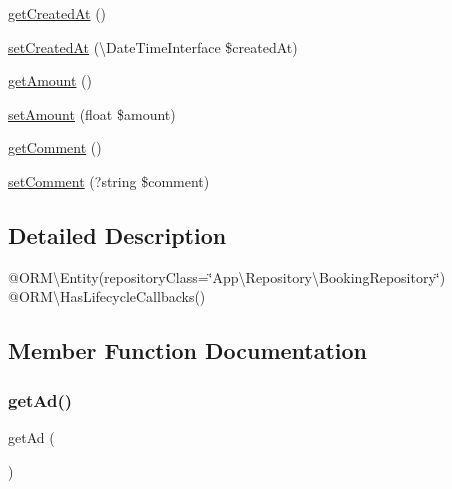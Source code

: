 \begin{DoxyCompactItemize}
\item 
\mbox{\hyperlink{class_app_1_1_entity_1_1_booking_a0f0455d4aafe27d1b0720c3bcfff2847}{get\+Created\+At}} ()
\item 
\mbox{\hyperlink{class_app_1_1_entity_1_1_booking_a2308609ef549a753223bbee71e36291e}{set\+Created\+At}} (\textbackslash{}Date\+Time\+Interface \$created\+At)
\item 
\mbox{\hyperlink{class_app_1_1_entity_1_1_booking_a4097b54f79b8353b00e8b6712f845562}{get\+Amount}} ()
\item 
\mbox{\hyperlink{class_app_1_1_entity_1_1_booking_a578faaf63e0b3c77b61aa210a47f7a8d}{set\+Amount}} (float \$amount)
\item 
\mbox{\hyperlink{class_app_1_1_entity_1_1_booking_adb57c3d1b74c19589ba1d641ea1a390e}{get\+Comment}} ()
\item 
\mbox{\hyperlink{class_app_1_1_entity_1_1_booking_ae1bfc93cadcdc2ef59d5c8c91a438c52}{set\+Comment}} (?string \$comment)
\end{DoxyCompactItemize}


\subsection{Detailed Description}
@\+O\+RM\textbackslash{}\+Entity(repository\+Class=\char`\"{}\+App\textbackslash{}\+Repository\textbackslash{}\+Booking\+Repository\char`\"{}) @\+O\+RM\textbackslash{}\+Has\+Lifecycle\+Callbacks() 

\subsection{Member Function Documentation}
\mbox{\label{class_app_1_1_entity_1_1_booking_acbaadb0b5b6f7e8ad6a9a0854e7fbf4c}} 
\subsubsection{\texorpdfstring{getAd()}{getAd()}}
{\footnotesize\ttfamily get\+Ad (\begin{DoxyParamCaption}{ }\end{DoxyParamCaption})}

\mbox{\label{class_app_1_1_entity_1_1_booking_a4097b54f79b8353b00e8b6712f845562}} 
